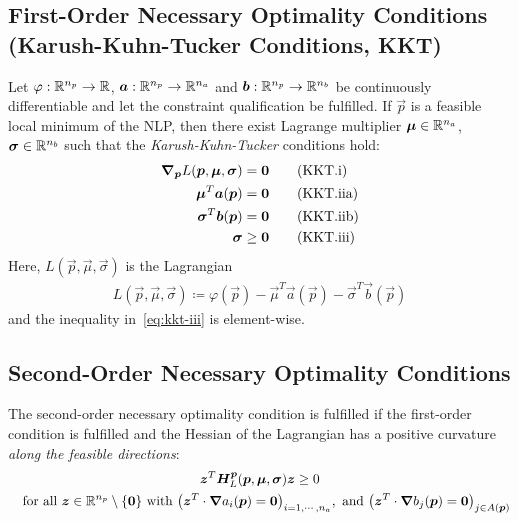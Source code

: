 		\subsection{First-Order Necessary Optimality Conditions (Karush-Kuhn-Tucker Conditions, KKT)}
			Let \( \varphi : \mathbb{R}^{n_p} \to \mathbb{R} \), \( \bm{a} : \mathbb{R}^{n_p} \to \mathbb{R}^{n_a} \) and \( \bm{b} : \mathbb{R}^{n_p} \to \mathbb{R}^{n_b} \) be continuously differentiable and let the constraint qualification be fulfilled. If \( \vec{p} \) is a feasible local minimum of the NLP, then there exist Lagrange multiplier \( \bm{\mu} \in \mathbb{R}^{n_a} \), \( \bm{\sigma} \in \mathbb{R}^{n_b} \) such that the \emph{Karush-Kuhn-Tucker} conditions hold:
			\begin{align}
				\grad_{\bm{p}}L(\bm{p}, \bm{\mu}, \bm{\sigma}) & = \bm{0}    \tag{KKT.i}   \\
				\bm{\mu}^T \bm{a}(\bm{p})                       & = \bm{0}    \tag{KKT.iia} \\
				\bm{\sigma}^T \bm{b}(\bm{p})                    & = \bm{0}    \tag{KKT.iib} \\
				\bm{\sigma}                                       & \geq \bm{0} \tag{KKT.iii} \label{eq:kkt-iii}
			\end{align}
			Here, \( L(\vec{p}, \vec{\mu}, \vec{\sigma}) \) is the Lagrangian
			\begin{align*}
				L(\vec{p}, \vec{\mu}, \vec{\sigma}) \coloneqq \varphi(\vec{p}) - \vec{\mu}^T \vec{a}(\vec{p}) - \vec{\sigma}^T \vec{b}(\vec{p})
			\end{align*}
			and the inequality in~\eqref{eq:kkt-iii} is element-wise.

		\subsection{Second-Order Necessary Optimality Conditions}
			The second-order necessary optimality condition is fulfilled if the first-order condition is fulfilled and the Hessian of the Lagrangian has a positive curvature \emph{along the feasible directions}:
			\begin{gather*}
				\bm{z}^T \bm{H}_L^{\bm{p}}(\bm{p}, \bm{\mu}, \bm{\sigma}) \bm{z} \geq 0 \\
				\quad\text{for all }
				\bm{z} \in \mathbb{R}^{n_p} \setminus \{\bm{0}\}
				\text{ with }
				\big( \bm{z}^T \cdot \grad{a_i}(\bm{p}) = \bm{0} \big)_{i = 1, \cdots, n_a},
				\text{ and }
				\big( \bm{z}^T \cdot \grad{b_j}(\bm{p}) = \bm{0} \big)_{j \in A(\bm{p})}
			\end{gather*}

